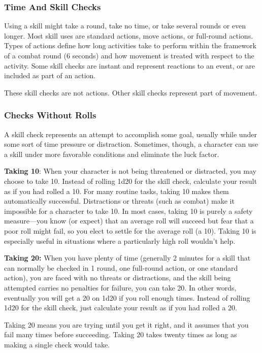 \subsubsection{Time And Skill Checks}
Using a skill might take a round, take no time, or take several rounds or even longer. Most skill uses are standard actions, move actions, or full-round actions. Types of actions define how long activities take to perform within the framework of a combat round (6 seconds) and how movement is treated with respect to the activity. Some skill checks are instant and represent reactions to an event, or are included as part of an action.

These skill checks are not actions. Other skill checks represent part of movement.

\subsubsection{Checks Without Rolls}
A skill check represents an attempt to accomplish some goal, usually while under some sort of time pressure or distraction. Sometimes, though, a character can use a skill under more favorable conditions and eliminate the luck factor.

\textbf{Taking 10}: When your character is not being threatened or distracted, you may choose to take 10. Instead of rolling 1d20 for the skill check, calculate your result as if you had rolled a 10. For many routine tasks, taking 10 makes them automatically successful. Distractions or threats (such as combat) make it impossible for a character to take 10. In most cases, taking 10 is purely a safety measure---you know (or expect) that an average roll will succeed but fear that a poor roll might fail, so you elect to settle for the average roll (a 10). Taking 10 is especially useful in situations where a particularly high roll wouldn't help.

\textbf{Taking 20:} When you have plenty of time (generally 2 minutes for a skill that can normally be checked in 1 round, one full-round action, or one standard action), you are faced with no threats or distractions, and the skill being attempted carries no penalties for failure, you can take 20. In other words, eventually you will get a 20 on 1d20 if you roll enough times. Instead of rolling 1d20 for the skill check, just calculate your result as if you had rolled a 20.

Taking 20 means you are trying until you get it right, and it assumes that you fail many times before succeeding. Taking 20 takes twenty times as long as making a single check would take.

